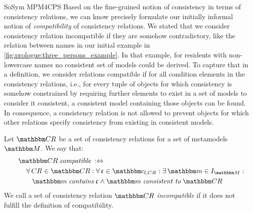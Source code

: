 \begin{copiedFrom}{SoSym MPM4CPS}
Based on the fine-grained notion of consistency in terms of consistency relations, we can know precisely formulate our initially informal notion of \emph{compatibility} of consistency relations.
We stated that we consider consistency relation incompatible if they are somehow contradictory, like the relation between names in our initial example in \autoref{fig:prologue:three_persons_example}.
In that example, for residents with non-lowercase names no consistent set of models could be derived.
To capture that in a definition, we consider relations compatible if for all condition elements in the consistency relations, i.e., for every tuple of objects for which consistency is somehow constrained by requiring further elements to exist in a set of models to consider it consistent, a consistent model containing those objects can be found. In consequence, a consistency relation is not allowed to prevent objects for which other relations specify consistency from existing in consistent models.

\begin{definition}[Compatibility] \label{def:compatibility}
    Let $\consistencyrelationset{CR}$ be a set of consistency relations for a set of metamodels $\metamodelset{M}$. %
    We say that:
    \begin{align*}
        \formulaskip &
        \consistencyrelationset{CR} \mathtext{compatible} \equivalentperdefinition \\
        & \formulaskip
        \forall \consistencyrelation{CR}{} \in \consistencyrelationset{CR} : \forall \conditionelement{c}{} \in \condition{c}{l, \consistencyrelation{CR}{}} %
        : \exists \modelset{m} \in \metamodelinstances{\metamodelset{M}} : \\
        & \formulaskip \formulaskip
        \modelset{m} \mathtext{contains} \conditionelement{c}{} \land \modelset{m} \mathtext{consistent to} \consistencyrelationset{CR}
    \end{align*}
    We call a set of consistency relation $\consistencyrelationset{CR}$ \emph{incompatible} if it does not fulfill the definition of compatibility.
\end{definition}


\end{copiedFrom}
